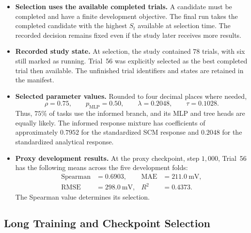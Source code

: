 \documentclass[11pt]{article}
\newenvironment{notes}
  {\begin{itemize}\setlength{\itemsep}{0.45em}\setlength{\parsep}{0pt}}
  {\end{itemize}}
\begin{document}
\begin{notes}
    \item \textbf{Selection uses the available completed trials.}
    A candidate must be completed and have a finite
    development objective. The final run takes the completed
    candidate with the highest \(S_t\) available at selection
    time. The recorded decision remains fixed even if the
    study later receives more results.

    \item \textbf{Recorded study state.}
    At selection, the study contained \(78\) trials, with
    six still marked as running.
    Trial~56 was explicitly selected as the best completed
    trial then available. The unfinished trial identifiers
    and states are retained in the manifest.

    \item \textbf{Selected parameter values.}
    Rounded to four decimal places where needed,
    \[
        \rho=0.75,\qquad
        p_{\mathrm{MLP}}=0.50,\qquad
        \lambda=0.2048,\qquad
        \tau=0.1028.
    \]
    Thus, \(75\%\) of tasks use the informed branch,
    and its MLP and tree heads are equally likely.
    The informed response mixture has coefficients of
    approximately \(0.7952\) for the standardized SCM
    response and \(0.2048\) for the standardized analytical
    response.

    \item \textbf{Proxy development results.}
    At the proxy checkpoint, step \(1{,}000\), Trial~56
    has the following means across the five development folds:
    \[
    \begin{aligned}
        \text{Spearman}&=0.6903,&
        \text{MAE}&=211.0\ \text{mV},\\
        \text{RMSE}&=298.0\ \text{mV},&
        R^2&=0.4373.
    \end{aligned}
    \]
    The Spearman value determines its selection.
\end{notes}

\subsection{Long Training and Checkpoint Selection}
\label{sec:final-training-and-selection}
\end{document}

